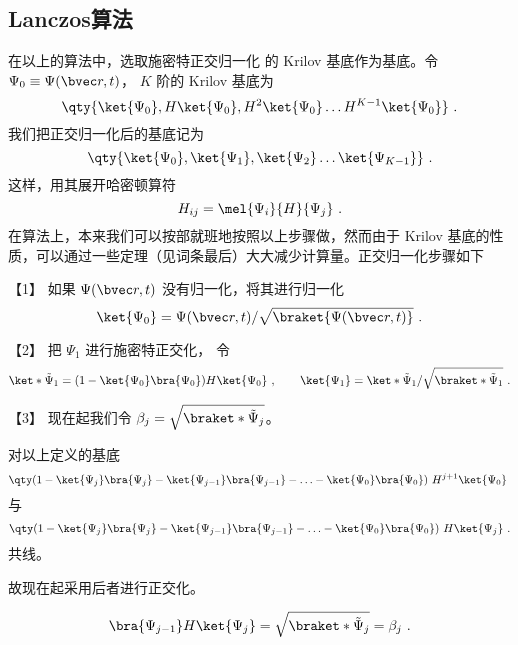 \subsection{Lanczos算法}
在以上的算法中，选取施密特正交归一化 %
的 Krilov 基底作为基底。令 $\Psi_0 \equiv \Psi(\bvec r, t)$，  $K$ 阶的 Krilov 基底为
 \begin{equation}
\qty{ \ket{\Psi_0}, H \ket{\Psi_0}, H^2 \ket{\Psi_0} \dots H^{K-1} \ket{\Psi_0}}~.
\end{equation}
我们把正交归一化后的基底记为
\begin{equation}\label{eq_Lanc_7}
\qty{ \ket{\Psi_0}, \ket{\Psi_1}, \ket{\Psi_2} \dots \ket{\Psi_{K-1}} }~.
\end{equation}
这样，用其展开哈密顿算符
\begin{equation}
H_{ij}=\mel{\Psi_i}{H}{\Psi_j}~.
\end{equation}
在算法上，本来我们可以按部就班地按照以上步骤做，然而由于 Krilov 基底的性质，可以通过一些定理（见词条最后）大大减少计算量。正交归一化步骤如下

【1】 如果 $\Psi(\bvec r,t)$ 没有归一化，将其进行归一化
\begin{equation}
\ket{\Psi_0}=\Psi(\bvec r,t)/\sqrt{\braket{\Psi(\bvec r,t)}}~.
\end{equation}

【2】 把 $\Psi_1$ 进行施密特正交化， 令
\begin{equation}\label{eq_Lanc_31}
\ket*{\tilde\Psi_1} = (1 - \ket{\Psi_0}\bra{\Psi_0})H \ket{\Psi_0}~,
\qquad
\ket{\Psi_1}=\ket*{\tilde\Psi_1}/\sqrt{\braket*{\tilde\Psi_1}}~.
\end{equation}

【3】 现在起我们令 $\beta_j = \sqrt{\braket*{\tilde\Psi_j}}$。 %

\begin{theorem}{}
对以上定义的基底
\begin{equation}
\qty(1 - \ket{\Psi_j} \bra{\Psi_j} - \ket{\Psi_{j - 1}} \bra{\Psi_{j - 1}} - \ldots - \ket{\Psi_0} \bra{\Psi_0})\ H^{j + 1} \ket{\Psi_0}~
\end{equation}
与
\begin{equation}
\qty( 1 - \ket{\Psi_j}\bra{\Psi_j} - \ket{\Psi_{j - 1}}\bra{\Psi_{j - 1}} - \ldots - \ket{\Psi_0}\bra{\Psi_0})\ H \ket{\Psi_j}~.
\end{equation}
共线。
\end{theorem}

故现在起采用后者进行正交化。

\begin{theorem}{}
\begin{equation}\label{eq_Lanc_13}
\bra{\Psi_{j-1}} H \ket{\Psi_j}  = \sqrt{\braket*{\tilde\Psi_j}} = \beta_j~.
\end{equation}
\end{theorem}

